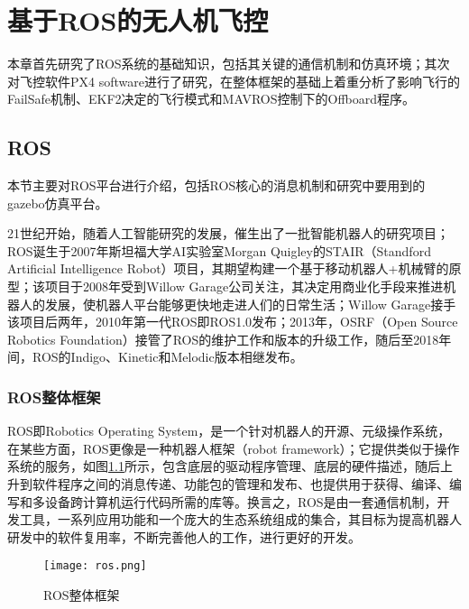 \renewcommand{\baselinestretch}{1.5}
\fontsize{12pt}{13pt}\selectfont

\chapter{基于ROS的无人机飞控}\label{introduction}

本章首先研究了ROS系统的基础知识，包括其关键的通信机制和仿真环境；其次对飞控软件PX4 software进行了研究，在整体框架的基础上着重分析了影响飞行的FailSafe机制、EKF2决定的飞行模式和MAVROS控制下的Offboard程序。

\section{ROS}
本节主要对ROS平台进行介绍，包括ROS核心的消息机制和研究中要用到的gazebo仿真平台。

21世纪开始，随着人工智能研究的发展，催生出了一批智能机器人的研究项目；ROS诞生于2007年斯坦福大学AI实验室Morgan Quigley的STAIR（Standford Artificial Intelligence Robot）项目，其期望构建一个基于移动机器人+机械臂的原型；该项目于2008年受到Willow Garage公司关注，其决定用商业化手段来推进机器人的发展，使机器人平台能够更快地走进人们的日常生活；Willow Garage接手该项目后两年，2010年第一代ROS即ROS1.0发布；2013年，OSRF（Open Source Robotics Foundation）接管了ROS的维护工作和版本的升级工作，随后至2018年间，ROS的Indigo、Kinetic和Melodic版本相继发布。

\subsection{ROS整体框架}

ROS即Robotics Operating System，是一个针对机器人的开源、元级操作系统，在某些方面，ROS更像是一种机器人框架（robot framework）；它提供类似于操作系统的服务，如图\ref{fig-ros}所示，包含底层的驱动程序管理、底层的硬件描述，随后上升到软件程序之间的消息传递、功能包的管理和发布、也提供用于获得、编译、编写和多设备跨计算机运行代码所需的库等。换言之，ROS是由一套通信机制，开发工具，一系列应用功能和一个庞大的生态系统组成的集合，其目标为提高机器人研发中的软件复用率，不断完善他人的工作，进行更好的开发。

\begin{figure}[!ht]
	\centering
	\texttt{[image: ros.png]}
	\caption{ROS整体框架} 
	\label{fig-ros}
\end{figure}

